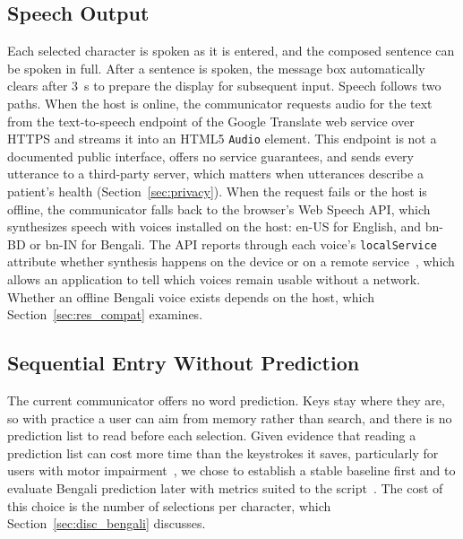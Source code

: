 \documentclass[journal]{IEEEtran}
\begin{document}


\subsection{Speech Output}
\label{sec:speech}
Each selected character is spoken as it is entered, and the composed sentence can be spoken in full. After a sentence is spoken, the message box automatically clears after 3~s to prepare the display for subsequent input. Speech follows two paths. When the host is online, the communicator requests audio for the text from the text-to-speech endpoint of the Google Translate web service over HTTPS and streams it into an HTML5 \texttt{Audio} element. This endpoint is not a documented public interface, offers no service guarantees, and sends every utterance to a third-party server, which matters when utterances describe a patient's health (Section~\ref{sec:privacy}). When the request fails or the host is offline, the communicator falls back to the browser's Web Speech API, which synthesizes speech with voices installed on the host: en-US for English, and bn-BD or bn-IN for Bengali. The API reports through each voice's \texttt{localService} attribute whether synthesis happens on the device or on a remote service~\cite{webspeech}, which allows an application to tell which voices remain usable without a network. Whether an offline Bengali voice exists depends on the host, which Section~\ref{sec:res_compat} examines.

\subsection{Sequential Entry Without Prediction}
\label{sec:noprediction}
The current communicator offers no word prediction. Keys stay where they are, so with practice a user can aim from memory rather than search, and there is no prediction list to read before each selection. Given evidence that reading a prediction list can cost more time than the keystrokes it saves, particularly for users with motor impairment~\cite{koester1994,koester1996}, we chose to establish a stable baseline first and to evaluate Bengali prediction later with metrics suited to the script~\cite{sarcar2015}. The cost of this choice is the number of selections per character, which Section~\ref{sec:disc_bengali} discusses.

\end{document}
